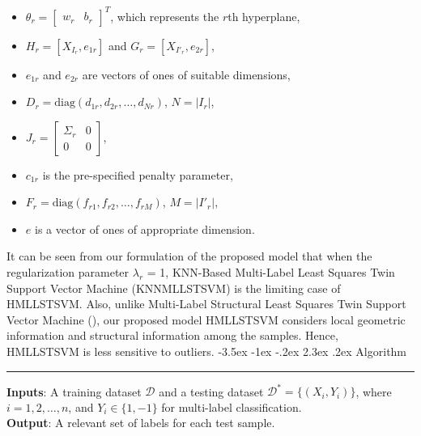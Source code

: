 \documentclass[12pt,a4paper,oneside,english]{report}
\makeatletter
\renewcommand\section{\@startsection {section}{1}{\z@}%
                                   {-3.5ex \@plus -1ex \@minus -.2ex}%
                                   {2.3ex \@plus.2ex}%
                                   {\centering\normalfont\LARGE\bfseries}}
\makeatother
\begin{document}
\begin{itemize}
    \item $\theta_r = \begin{bmatrix} w_r & b_r \end{bmatrix}^T$, which represents the $r$th hyperplane,
    \item $H_r = \left[X_{I_r}, e_{1r}\right]$ and $G_r = \left[X_{I'_r}, e_{2r}\right]$,
    \item $e_{1r}$ and $e_{2r}$ are vectors of ones of suitable dimensions,
    \item $D_r = \text{diag}\left(d_{1r}, d_{2r}, \ldots, d_{Nr}\right)$, $N = |I_r|$,
    \item $J_r = 
    \begin{bmatrix} 
    \Sigma_r & 0 \\ 
    0 & 0 
    \end{bmatrix}$,
    \item $c_{1r}$ is the pre-specified penalty parameter,
    \item $F_r = \text{diag}\left(f_{r1}, f_{r2}, \ldots, f_{rM}\right)$, $M = |I'_r|$,
    \item $e$ is a vector of ones of appropriate dimension.
\end{itemize}


It can be seen from our formulation of the proposed model that when the regularization parameter $\lambda_r$ = 1, KNN-Based Multi-Label Least Squares Twin Support Vector Machine (KNNMLLSTSVM) is the limiting case of HMLLSTSVM. Also, unlike Multi-Label Structural Least Squares Twin Support Vector Machine (\cite{azad2020ml}), our proposed model HMLLSTSVM considers local geometric information and structural information among the samples. Hence, HMLLSTSVM is less sensitive to outliers.
\section{Algorithm}
\hrule
\textbf{Inputs}: A training dataset $\mathcal{D}$ and a testing dataset $\mathcal{D^*} = \{(X_i, Y_i)\}$, where $i = 1, 2, \ldots, n$, and $Y_i \in \{1, -1\}$ for multi-label classification.\\
\textbf{Output}: A relevant set of labels for each test sample. 
\end{document}
